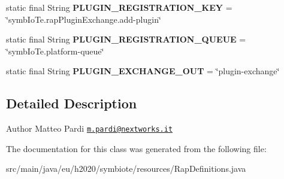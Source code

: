 \begin{DoxyCompactItemize}
\item 
\mbox{\label{classeu_1_1h2020_1_1symbiote_1_1resources_1_1RapDefinitions_a0824649777d16628578a8b9987d18a18}} 
static final String {\bfseries P\+L\+U\+G\+I\+N\+\_\+\+R\+E\+G\+I\+S\+T\+R\+A\+T\+I\+O\+N\+\_\+\+K\+EY} = \char`\"{}symb\+Io\+Te.\+rap\+Plugin\+Exchange.\+add-\/plugin\char`\"{}
\item 
\mbox{\label{classeu_1_1h2020_1_1symbiote_1_1resources_1_1RapDefinitions_a6be16cdadbaadfc02c4b86da03413b7f}} 
static final String {\bfseries P\+L\+U\+G\+I\+N\+\_\+\+R\+E\+G\+I\+S\+T\+R\+A\+T\+I\+O\+N\+\_\+\+Q\+U\+E\+UE} = \char`\"{}symb\+Io\+Te.\+platform-\/queue\char`\"{}
\item 
\mbox{\label{classeu_1_1h2020_1_1symbiote_1_1resources_1_1RapDefinitions_a730953415b02f8c8f3271c82292ca90d}} 
static final String {\bfseries P\+L\+U\+G\+I\+N\+\_\+\+E\+X\+C\+H\+A\+N\+G\+E\+\_\+\+O\+UT} = \char`\"{}plugin-\/exchange\char`\"{}
\end{DoxyCompactItemize}


\subsection{Detailed Description}
\begin{DoxyAuthor}{Author}
Matteo Pardi \href{mailto:m.pardi@nextworks.it}{\tt m.\+pardi@nextworks.\+it} 
\end{DoxyAuthor}


The documentation for this class was generated from the following file\+:\begin{DoxyCompactItemize}
\item 
src/main/java/eu/h2020/symbiote/resources/Rap\+Definitions.\+java\end{DoxyCompactItemize}
